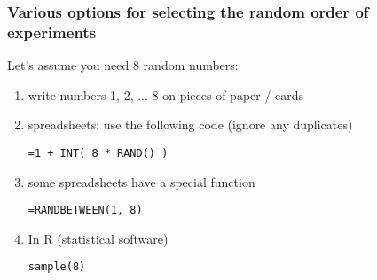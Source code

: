 \begin{frame}\frametitle{Various options for selecting the random order of experiments}
	Let's assume you need 8 random numbers:
	\begin{enumerate}
		\item	write numbers 1, 2, ... 8 on pieces of paper / cards
		\item	spreadsheets: use the following code (ignore any duplicates)
			\begin{varblock}[5cm]{}
				\texttt{=1 + INT( 8 * RAND() )}
			\end{varblock}

		\item	some spreadsheets have a special function
			\begin{varblock}[5cm]{}
				\texttt{=RANDBETWEEN(1, 8)}
				\begin{center}
				\end{center}
			\end{varblock}

		\item	In R (statistical software)
			\begin{varblock}[5cm]{}
				\texttt{sample(8)}
			\end{varblock}
	\end{enumerate}
\end{frame}

{
\begin{frame}\frametitle{}
\end{frame}}

{
\begin{frame}\frametitle{}
\end{frame}}

{
\begin{frame}\frametitle{}
\end{frame}}

